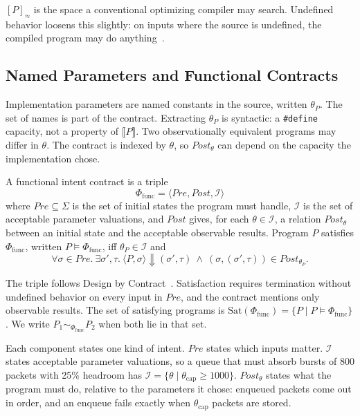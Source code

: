 \([P]_\approx\) is the space a conventional optimizing compiler may search.
Undefined behavior loosens this slightly: on inputs where the source is
undefined, the compiled program may do anything~\cite{lopes2021alive2,
lee2017taming}.

\subsection{Named Parameters and Functional Contracts}
\label{sec:contract}

Implementation parameters are named constants in the source, written
\(\theta_P\). The set of names is part of the contract. Extracting
\(\theta_P\) is syntactic: a \texttt{\#define} capacity, not a property of
\(\llbracket P \rrbracket\). Two observationally equivalent programs may
differ in \(\theta\). The contract is indexed by \(\theta\), so
\(\mathit{Post}_\theta\) can depend on the capacity the implementation chose.

\begin{definition}
\label{def:contract}
A functional intent contract is a triple
\[
\Phi_{\text{func}} = \langle \mathit{Pre}, \mathit{Post}, \mathcal{I} \rangle
\]
where \(\mathit{Pre} \subseteq \Sigma\) is the set of initial states the
program must handle, \(\mathcal{I}\) is the set of acceptable parameter
valuations, and \(\mathit{Post}\) gives, for each \(\theta \in \mathcal{I}\),
a relation \(\mathit{Post}_\theta\) between an initial state and the
acceptable observable results.
Program \(P\) satisfies \(\Phi_{\text{func}}\), written
\(P \models \Phi_{\text{func}}\), iff \(\theta_P \in \mathcal{I}\) and
\[
\forall \sigma \in \mathit{Pre}.\ \exists \sigma', \tau.\
\langle P, \sigma \rangle \Downarrow (\sigma', \tau)
\ \wedge\ (\sigma, (\sigma', \tau)) \in \mathit{Post}_{\theta_P}.
\]
\end{definition}

The triple follows Design by Contract~\cite{meyer1988eiffel}.
Satisfaction requires termination without undefined behavior on every input
in \(\mathit{Pre}\), and the contract mentions only observable results. The
set of satisfying programs is
\(\mathrm{Sat}(\Phi_{\text{func}}) = \{P \mid P \models \Phi_{\text{func}}\}\).
We write \(P_1 \sim_{\Phi_{\text{func}}} P_2\) when both lie in that set.

Each component states one kind of intent. \(\mathit{Pre}\) states which
inputs matter. \(\mathcal{I}\) states acceptable parameter valuations, so a
queue that must absorb bursts of 800 packets with 25\% headroom has
\(\mathcal{I} = \{\theta \mid \theta_{\mathrm{cap}} \ge 1000\}\).
\(\mathit{Post}_\theta\) states what the program must do, relative to the
parameters it chose: enqueued packets come out in order, and an enqueue fails
exactly when \(\theta_{\mathrm{cap}}\) packets are stored.

